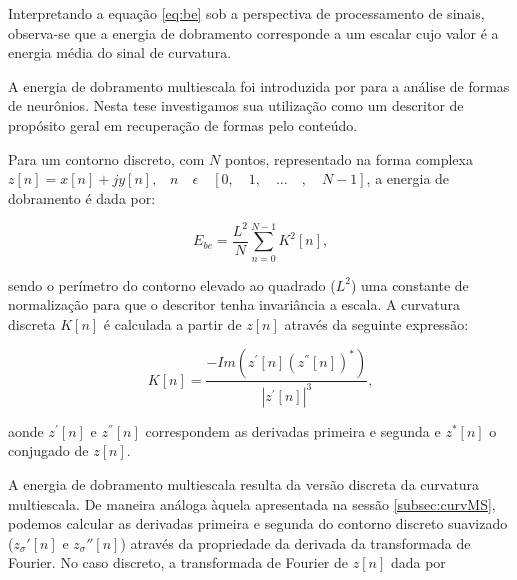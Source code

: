 Interpretando a equação \ref{eq:be} sob a perspectiva de processamento de sinais, observa-se que a energia de dobramento corresponde a um escalar cujo valor é a energia média do sinal de curvatura.

\begin{comment}
A energia de dobramento multiescala é obtida a partir da curvatura multiescala repetindo-se o cálculo da equação \ref{eq:be} para diferentes níveis de suavização do contorno. Isso resulta em um vetor de características composto por escalares decorrentes da curvatura multiescala para cada uma das escalas empregadas na suavisação do contorno e cálculo da curvatura. 
\end{comment}

A energia de dobramento multiescala foi introduzida por  para a análise de formas de neurônios. Nesta tese investigamos sua utilização como um descritor de propósito geral em recuperação de formas pelo conteúdo.

Para um contorno discreto, com $N$ pontos, representado na forma complexa $z[n] = x[n]+jy[n] \text{,} \quad n \quad \epsilon \quad [0, \quad 1, \quad \ldots \quad , \quad N-1]$, a energia de dobramento é dada por: 

\begin{equation}
E_{be} = \frac{L^{2}}{N}\sum_{n=0}^{N-1}K^{2}[n]\text{,}
\label{eq:ebe}
\end{equation}

sendo o perímetro do contorno elevado ao quadrado ($L^2$) uma constante de normalização para que o descritor tenha invariância a escala. A curvatura discreta $K[n]$ é calculada a partir de $z[n]$ através da seguinte expressão:

\begin{equation}
K[n] = \frac{-Im(z^{'}[n](z^{''}[n])^{*})}{|z^{'}[n]|^3} \text{,}
\label{eq:kn}
\end{equation}

aonde $z^{'}[n]$ e $z^{''}[n]$ correspondem as derivadas primeira e segunda e $z^{*}[n]$ o conjugado de $z[n]$. 

A energia de dobramento multiescala resulta da versão discreta da curvatura multiescala. De maneira análoga àquela apresentada na sessão \ref{subsec:curvMS}, podemos calcular as derivadas primeira e segunda do contorno discreto suavizado ($z_\sigma'[n]$ e $z_\sigma''[n]$) através da propriedade da derivada da transformada de Fourier. No caso discreto, a transformada de Fourier de $z[n]$ dada por 

